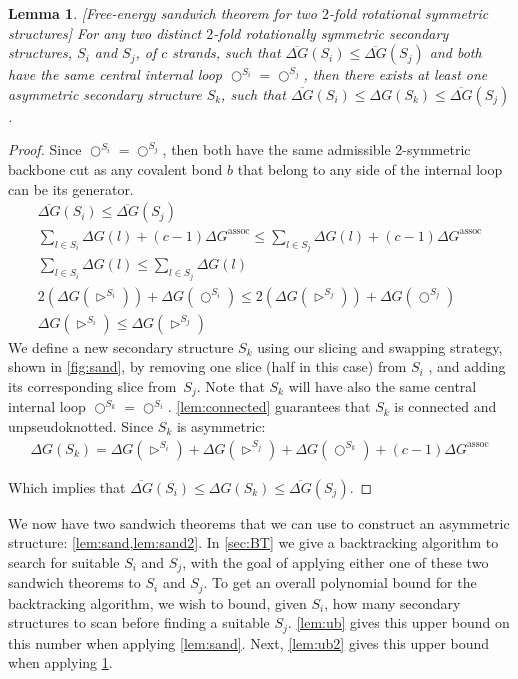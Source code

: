 \documentclass[11pt,letterpaper]{article}  \usepackage[margin=1in]{geometry}
\newtheorem{lemma}[theorem]{Lemma}
\theoremstyle{definition}  \newtheorem{Definition}[theorem]{Definition}
\newcommand{\DGnosym}{\ensuremath{\overline{\Delta G}}}
\begin{document}
\begin{lemma}\label{lem:sand2}[Free-energy sandwich theorem for two $2$-fold rotational symmetric structures]
	For any two distinct  $2$-fold rotationally symmetric secondary structures, $S_i$ and $S_j$, of $c$ strands, such that $\DGnosym(S_i) \leq \DGnosym(S_j)$ and both have the same central internal loop $\bigcirc^{S_i} = \bigcirc^{S_j}$, then there exists at least one asymmetric secondary structure $S_k$, such that $\DGnosym(S_i) \leq \Delta G(S_k) \leq \DGnosym(S_j)$.  
\end{lemma}
\begin{proof}
	Since $\bigcirc^{S_i} = \bigcirc^{S_j}$,  then both have the same admissible 2-symmetric backbone cut as any covalent bond $b$ that belong to any side of the internal loop can be its generator.
	\begin{gather*}
		\DGnosym(S_i) \leq \DGnosym(S_j)
		\\
		\sum_{l\in S_i} \Delta G(l)
		+  (c-1)\Delta G^{\textrm{assoc}} \leq \sum_{l\in S_j} \Delta G(l)
		+  (c-1)\Delta G^{\textrm{assoc}}
		\\
		\sum_{l\in S_i} \Delta G(l)
		\leq \sum_{l\in S_j} \Delta G(l)
		\\
		2(\Delta G(\rhd^{S_i}))+ \Delta G(\bigcirc^{S_i})
		\leq 2(\Delta G(\rhd^{S_j}))+ \Delta G(\bigcirc^{S_j})
		\\
		\Delta G(\rhd^{S_i})
		\leq \Delta G(\rhd^{S_j})
	\end{gather*}	
	We define a new secondary structure $S_k$ using our slicing and swapping strategy, shown in \cref{fig:sand}, by removing one slice  (half in this case) from $S_i$ , and adding its corresponding slice from~$S_j$. 
	Note that $S_k$ will have also the same central internal loop $\bigcirc^{S_k}= \bigcirc^{S_i}$. \cref{lem:connected} guarantees that $S_k$ is connected and unpseudoknotted. Since $S_k$ is asymmetric: 
	\begin{gather*}
		\Delta G(S_k) = \Delta G(\rhd^{S_i}) +\Delta G(\rhd^{S_j}) + \Delta G(\bigcirc^{S_k}) + (c-1)\Delta G^{\textrm{assoc}}
	\end{gather*}
	
	Which implies that $\DGnosym(S_i) \leq \Delta G(S_k) \leq \DGnosym(S_j)$. 
\end{proof}

We now have two sandwich theorems that we can use to construct an asymmetric structure: \cref{lem:sand,lem:sand2}. In \cref{sec:BT} we give a backtracking algorithm to search for suitable $S_i$ and $S_j$, with the goal of  applying either one of these two sandwich theorems to $S_i$ and $S_j$. 
To get an overall polynomial bound for the backtracking algorithm, we wish to bound, given $S_i$, how many secondary structures to scan before finding a suitable $S_j$.    
\cref{lem:ub} gives this upper bound on this number  when applying \cref{lem:sand}. 
Next, \cref{lem:ub2} gives this upper bound  when applying  \cref{lem:sand2}. 
\end{document}
